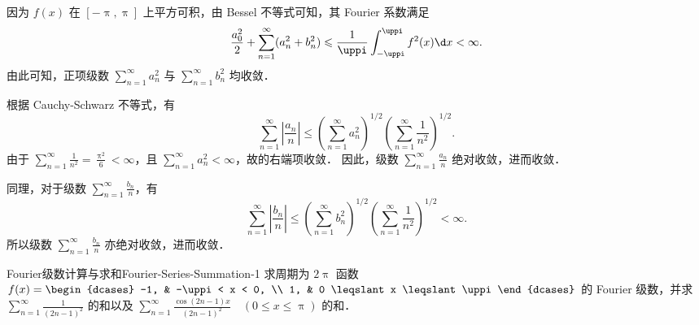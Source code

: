 \begin{myproof}
    因为 $f(x)$ 在 $[-\uppi, \uppi]$ 上平方可积，由 Bessel 不等式可知，其 Fourier 系数满足
    \begin{equation}
        \frac{a_0^2}{2} + \sum_{n=1}^{\infty} (a_n^2 + b_n^2) \leqslant \frac{1}{\uppi} \int_{-\uppi}^{\uppi} f^2(x) \d x < \infty.
    \end{equation}
    由此可知，正项级数 $\sum_{n=1}^{\infty} a_n^2$ 与 $\sum_{n=1}^{\infty} b_n^2$ 均收敛．

    根据 Cauchy-Schwarz 不等式，有
    \begin{equation}\label{eq:cauchy-2}
        \sum_{n=1}^{\infty} \left| \frac{a_n}{n} \right| \leqslant \left( \sum_{n=1}^{\infty} a_n^2 \right)^{1/2} \left( \sum_{n=1}^{\infty} \frac{1}{n^2} \right)^{1/2}.
    \end{equation}
    由于 $\sum_{n=1}^{\infty} \frac{1}{n^2} = \frac{\uppi^2}{6} < \infty$，且 $\sum_{n=1}^{\infty} a_n^2 < \infty$，故的右端项收敛．
    因此，级数 $\sum_{n=1}^{\infty} \frac{a_n}{n}$ 绝对收敛，进而收敛．

    同理，对于级数 $\sum_{n=1}^{\infty} \frac{b_n}{n}$，有
    \begin{equation}
        \sum_{n=1}^{\infty} \left| \frac{b_n}{n} \right| \leqslant \left( \sum_{n=1}^{\infty} b_n^2 \right)^{1/2} \left( \sum_{n=1}^{\infty} \frac{1}{n^2} \right)^{1/2} < \infty.
    \end{equation}
    所以级数 $\sum_{n=1}^{\infty} \frac{b_n}{n}$ 亦绝对收敛，进而收敛．
\end{myproof}

\begin{problem}{Fourier级数计算与求和}{Fourier-Series-Summation-1}
    求周期为 $2\uppi$ 函数 $f(x) = \begin{dcases} -1, & -\uppi < x < 0, \\ 1, & 0 \leqslant x \leqslant \uppi \end{dcases}$ 的 Fourier 级数，并求 $\sum_{n=1}^{\infty} \frac{1}{(2n-1)^2}$ 的和以及 $\sum_{n=1}^{\infty} \frac{\cos(2n-1)x}{(2n-1)^2} \quad (0 \leqslant x \leqslant \uppi)$ 的和．
\end{problem}

